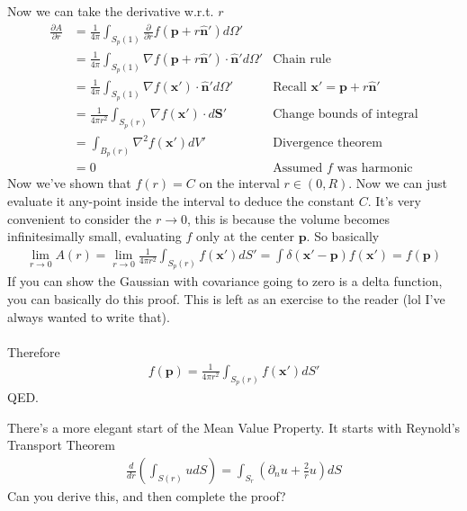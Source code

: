 \documentclass[12pt,fleqn]{article}
\numberwithin{equation}{section} %
\newcounter{problem}
\begin{document}
Now we can take the derivative w.r.t. $r$
\begin{align}
	\frac{\partial A}{\partial r} & = \frac{1}{4\pi} \int_{S_p(1)} \frac{\partial}{\partial r}  f(\mathbf p + r \mathbf{\hat n}') d \Omega'\\
	& = \frac{1}{4\pi} \int_{S_p(1)} \nabla f(\mathbf p + r \mathbf{\hat n}')  \cdot \mathbf{\hat n}' d \Omega' & \text{Chain rule}\\
	& = \frac{1}{4\pi} \int_{S_p(1)} \nabla f(\mathbf x') \cdot \mathbf{\hat n}' d \Omega'& \text{Recall } \mathbf x' = \mathbf p + r \mathbf{\hat n}'\\
	& = \frac{1}{4\pi r^2} \int_{S_p(r)} \nabla f(\mathbf x') \cdot d \mathbf S' & \text{Change bounds of integral}\\
	& = \int_{B_p(r)} \nabla^2 f(\mathbf x') dV' & \text{Divergence theorem}\\
	& = 0 & \text{Assumed } f \text{ was harmonic} 
\end{align}
Now we've shown that $f(r) = C$ on the interval $r \in (0,R)$. Now we can just evaluate it any-point inside the interval to deduce the constant $C$. It's very convenient to consider the $r \to 0$, this is because the volume becomes infinitesimally small, evaluating $f$ only at the center $\mathbf p$. So basically
\begin{align}
	\lim_{r \to 0}A(r)  = 
	\lim_{r \to 0}\frac{1}{4\pi r^2} \int_{S_p(r)} f(\mathbf x') dS' =\int \delta(\mathbf x' -\mathbf p) f(\mathbf x') = f(\mathbf p)
\end{align}
If you can show the Gaussian with covariance going to zero is a delta function, you can basically do this proof. This is left as an exercise to the reader (lol I've always wanted to write that).\\
\\
Therefore
\begin{align}
	f(\mathbf p) = \frac{1}{4\pi r^2} \int_{S_{p}(r) } f(\mathbf x')dS'
\end{align}
QED.

\begin{problem}
 	There's a more elegant start of the Mean Value Property. It starts with Reynold's Transport Theorem
 	\begin{align}
 		\frac{d}{dr} \left(\int_{S(r)} u dS\right) = \int_{S_r} (\partial_n u + \frac{2}{r} u) dS 
 	\end{align}
 	Can you derive this, and then complete the proof?
\end{problem}
\end{document}
